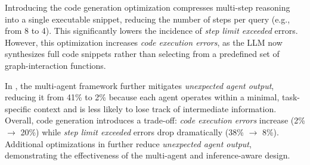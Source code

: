Introducing the code generation optimization compresses multi-step reasoning into a single executable snippet, reducing the number of steps per query (e.g., from 8 to 4). This significantly lowers the incidence of \emph{step limit exceeded} errors. However, this optimization increases \emph{code execution errors}, as the LLM now synthesizes full code snippets rather than selecting from a predefined set of graph-interaction functions.  

In \projectname, the multi-agent framework further mitigates \emph{unexpected agent output}, reducing it from 41\% to 2\% because each agent operates within a minimal, task-specific context and is less likely to lose track of intermediate information. Overall, code generation introduces a trade-off: \emph{code execution errors} increase (2\% $\rightarrow$ 20\%) while \emph{step limit exceeded} errors drop dramatically (38\% $\rightarrow$ 8\%). 
Additional optimizations in \projectname further reduce \emph{unexpected agent output}, demonstrating the effectiveness of the multi-agent and inference-aware design.







